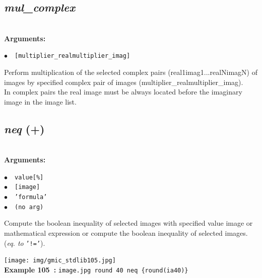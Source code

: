 \documentclass[a4paper,10.5pt,twoside]{book}
\def\comma{\discretionary{,}{}{,}}
\newcommand{\Cb}[1]{\textcolor{cb}{#1}}
\begin{document}
\subsection{\emph{mul\_complex} }\vspace*{-0.7em}
~\\\textbf{\Cb{Arguments: }}\begin{flushleft}
{\small \Cb{\hspace*{0.5cm}$\bullet$~~\texttt{[multiplier\_real{\comma}multiplier\_imag]}}}\end{flushleft}
Perform multiplication of the selected complex pairs (real1{\comma}imag1{\comma}...{\comma}realN{\comma}imagN) of images by specified complex pair of images (multiplier\_real{\comma}multiplier\_imag).
~\\In complex pairs{\comma} the real image must be always located before the imaginary image in the image list.


\subsection{\emph{neq} (+)}\vspace*{-0.7em}
~\\\textbf{\Cb{Arguments: }}\begin{flushleft}
{\small \Cb{\hspace*{0.5cm}$\bullet$~~\texttt{value[\%]}}}~~~\\
{\small \Cb{\hspace*{0.5cm}$\bullet$~~\texttt{[image]}}}~~~\\
{\small \Cb{\hspace*{0.5cm}$\bullet$~~\texttt{'formula'}}}~~~\\
{\small \Cb{\hspace*{0.5cm}$\bullet$~~\texttt{(no arg)}}}\end{flushleft}
Compute the boolean inequality of selected images with specified value{\comma} image or
mathematical expression{\comma} or compute the boolean inequality of selected images.
~\\(\emph{eq. to} {\small \texttt{'!='}}).
\begin{center}\texttt{[image: img/gmic\_stdlib105.jpg]}\\
{\footnotesize \textbf{Example 105~:} \texttt{image.jpg round 40 neq \{round(ia{\comma}40)\}}}
\end{center}
\end{document}
